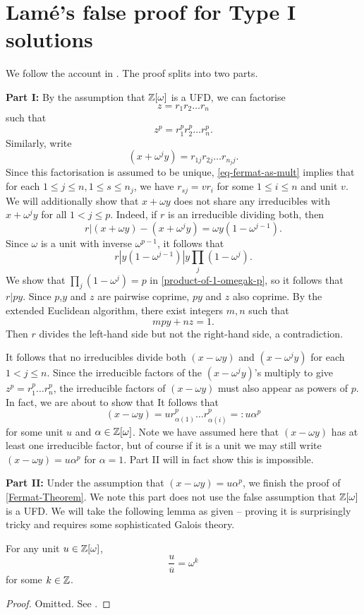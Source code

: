 \section{Lamé's false proof for Type I solutions}
We follow the account in \cite{Wright}. The proof splits into two parts.

\textbf{Part I:} By the assumption that $\mathbb{Z}[\omega]$ is a UFD, we can factorise
$$z=r_1r_2\dots r_n$$ such that $$z^p=r_1^p r_2^p\dots r_n^p.$$ Similarly, write $$(x+\omega^jy)=r_{1j}r_{2j}\dots r_{n_j j}.$$ Since this factorisation is assumed to be unique, \cref{eq-fermat-as-mult} implies that for each \newline$1\leq j \leq n, 1\leq s\leq n_j$, we have $r_{sj}=vr_i$ for some $1\leq i\leq n$ and unit $v$. We will additionally show that $x+\omega y$ does not share any irreducibles with $x+\omega^j y$ for all $1<j\leq p$. Indeed, if $r$ is an irreducible dividing both, then $$r|(x+\omega y) - (x+\omega^j y)=\omega y(1-\omega^{j-1}).$$
Since $\omega$ is a unit with inverse $\omega^{p-1}$, it follows that $$r|y(1-\omega^{j-1})|y\prod_{j}(1-\omega^{j}).$$ We show that $\prod_{j}(1-\omega^j)=p$ in \cref{product-of-1-omegak-p}, so it follows that $r|py$. Since $p$,$y$ and $z$ are pairwise coprime, $py$ and $z$ also coprime. By the extended Euclidean algorithm, there exist integers $m,n$ such that $$mpy+nz=1.$$ Then $r$ divides the left-hand side but not the right-hand side, a contradiction.

It follows that no irreducibles divide both $(x-\omega y)$ and $(x-\omega^j y)$ for each \newline$1<j\leq n$. Since the irreducible factors of the $(x-\omega^jy)$'s multiply to give $z^p=r_1^p\dots r_n^p$, the irreducible factors of $(x-\omega y)$ must also appear as powers of $p$.  In fact, we are about to show that 
It follows that \begin{equation}(x-\omega y)=ur_{\alpha(1)}^p\dots r^p_{\alpha(i)}=:u\alpha^p\end{equation} for some unit $u$ and $\alpha\in \mathbb{Z}[\omega]$. Note we have assumed here that $(x-\omega y)$ has at least one irreducible factor, but of course if it is a unit we may still write $(x-\omega y)=u\alpha^p$ for $\alpha=1$. Part II will in fact show this is impossible.

\textbf{Part II:} Under the assumption that $(x-\omega y)=u\alpha^p$, we finish the proof of \cref{Fermat-Theorem}. We note this part does not use the false assumption that $\mathbb{Z}[\omega]$ is a UFD. We will take the following lemma as given -- proving it is surprisingly tricky and requires some sophisticated Galois theory.
\begin{lemma}\label{Kummers-lemma}
For any unit $u\in \mathbb{Z}[\omega]$, $$\frac{u}{\overline{u}}=\omega^k$$ for some $k\in \mathbb{Z}$. 
\end{lemma}
\begin{proof}
Omitted. See \cite{NumberFields}.
\end{proof}

